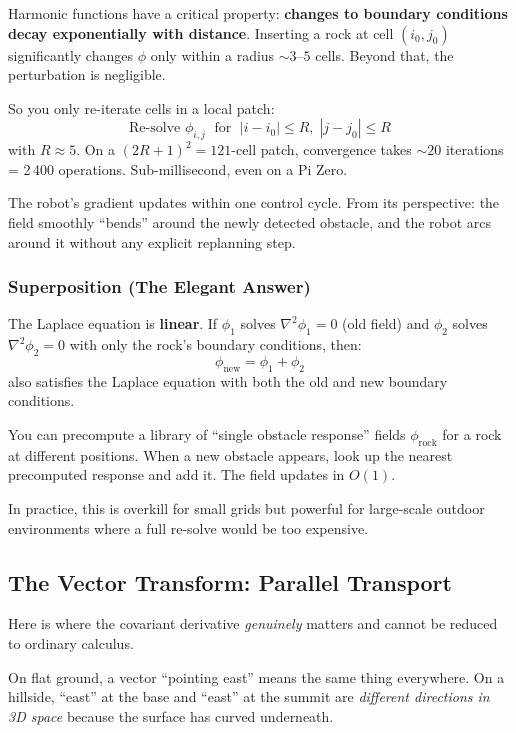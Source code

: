 \documentclass[11pt]{article}
\begin{document}
Harmonic functions have a critical property: \textbf{changes to
boundary conditions decay exponentially with distance}.  Inserting a
rock at cell $(i_0, j_0)$ significantly changes $\phi$ only within
a radius $\sim\! 3$--$5$ cells.  Beyond that, the perturbation is
negligible.

So you only re-iterate cells in a local patch:
\begin{equation}
    \text{Re-solve } \phi_{i,j} \;\text{ for }\;
    |i - i_0| \leq R,\; |j - j_0| \leq R
\end{equation}
with $R \approx 5$.  On a $(2R+1)^2 = 121$-cell patch, convergence
takes ${\sim}20$ iterations = 2\,400 operations.  Sub-millisecond,
even on a Pi Zero.

The robot's gradient updates within one control cycle.  From its
perspective: the field smoothly ``bends'' around the newly detected
obstacle, and the robot arcs around it without any explicit replanning
step.

\subsubsection{Superposition (The Elegant Answer)}

The Laplace equation is \textbf{linear}.  If $\phi_1$ solves
$\nabla^2\phi_1 = 0$ (old field) and $\phi_2$ solves
$\nabla^2\phi_2 = 0$ with only the rock's boundary conditions, then:
\begin{equation}
    \phi_{\text{new}} = \phi_1 + \phi_2
\end{equation}
also satisfies the Laplace equation with both the old and new
boundary conditions.

You can precompute a library of ``single obstacle response''
fields $\phi_{\text{rock}}$ for a rock at different positions.
When a new obstacle appears, look up the nearest precomputed
response and add it.  The field updates in $O(1)$.

In practice, this is overkill for small grids but powerful for
large-scale outdoor environments where a full re-solve would be
too expensive.

\subsection{The Vector Transform: Parallel Transport}

Here is where the covariant derivative \emph{genuinely} matters
and cannot be reduced to ordinary calculus.

On flat ground, a vector ``pointing east'' means the same thing
everywhere.  On a hillside, ``east'' at the base and ``east'' at
the summit are \emph{different directions in 3D space} because the
surface has curved underneath.
\end{document}
